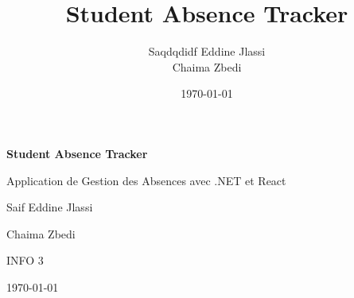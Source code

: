 \documentclass[12pt,a4paper]{article}
\title{\Huge\textbf{Student Absence Tracker}}
\author{\Large Saqdqdidf Eddine Jlassi \\ \Large Chaima Zbedi}
\date{\today}
\begin{document}
\begin{titlepage}
    \centering
    \vspace*{2cm}
    {\Huge\bfseries Student Absence Tracker\par}
    \vspace{1cm}
    {\Large Application de Gestion des Absences avec .NET et React\par}
    \vspace{2cm}
    
    
    \vspace{2cm}
    {\Large Saif Eddine Jlassi\par}
    {\Large Chaima Zbedi\par}
    \vspace{0.5cm}
    {\large INFO 3\par}
    \vfill
    {\large \today\par}
\end{titlepage}

\newpage


\newpage
\tableofcontents

\newpage

\newpage

\newpage

\newpage

\newpage

\newpage

\newpage

\newpage

\newpage


% 
% 
\end{document}
